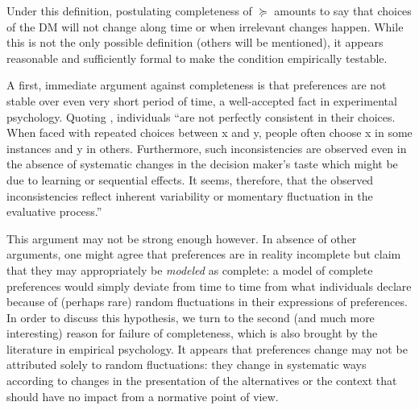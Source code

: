 \documentclass[version=last, pagesize, twocolumn, twoside=off, bibliography=totoc, 12pt, a4paper, english]{scrartcl}
\begin{document}
Under this definition, postulating completeness of $\succeq$ amounts to say that choices of the \ac{DM} will not change along time or when irrelevant changes happen. While this is not the only possible definition (others will be mentioned), it appears reasonable and sufficiently formal to make the condition empirically testable.
	
A first, immediate argument against completeness is that preferences are not stable over even very short period of time, a well-accepted fact in experimental psychology. Quoting \citet{tversky_intransitivity_1969}, individuals “are not perfectly consistent in their choices. When faced with repeated choices between x and y, 
people often choose x in some instances and y in others. Furthermore, such inconsistencies are observed even in the absence of systematic changes in the decision maker’s taste which might be due to learning or sequential effects. It seems, therefore, that the observed 
inconsistencies reflect inherent variability 
or momentary fluctuation 
in the evaluative process.” 
	
This argument may not be strong enough however. In absence of other arguments, one might agree that preferences are in reality incomplete but claim that they may appropriately be \emph{modeled} as complete: a model of complete preferences would simply deviate from time to time from what individuals declare because of (perhaps rare) random fluctuations in their expressions of preferences. 
In order to discuss this hypothesis, we turn to the second (and much more interesting) reason for failure of completeness, which is also brought by the literature in empirical psychology. It appears that preferences change may not be attributed solely to random fluctuations: they change in systematic ways according to changes in the presentation of the alternatives or the context that should have no impact from a normative point of view.
	
\end{document}
